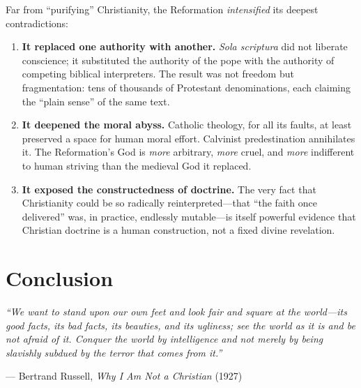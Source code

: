 \documentclass[11pt,twoside]{article}
\begin{document}
\begin{scheda}

Far from ``purifying'' Christianity, the Reformation \emph{intensified} its
deepest contradictions:

\begin{enumerate}
  \item \textbf{It replaced one authority with another.}
    \textit{Sola scriptura} did not liberate conscience; it substituted the
    authority of the pope with the authority of
    competing biblical interpreters.  The result was not freedom but
    fragmentation: tens of thousands of Protestant
    denominations, each claiming the
    ``plain sense'' of the same text.

  \item \textbf{It deepened the moral abyss.}
    Catholic theology, for all its faults, at least preserved a space for
    human moral effort.  Calvinist predestination annihilates it.  The
    Reformation's God is \emph{more} arbitrary, \emph{more} cruel, and
    \emph{more} indifferent to human striving than the medieval God it
    replaced.

  \item \textbf{It exposed the constructedness of doctrine.}
    The very fact that Christianity could be so radically reinterpreted---that
    ``the faith once delivered'' was, in practice, endlessly mutable---is
    itself powerful evidence that Christian doctrine is a human
    construction, not a
    fixed divine revelation.
\end{enumerate}
\end{scheda}

\newpage

\section*{Conclusion}

\begin{citazione}
\textit{``We want to stand upon our own feet and look fair and square at the
world---its good facts, its bad facts, its beauties, and its ugliness; see
the world as it is and be not afraid of it.  Conquer the world by
intelligence and not merely by being slavishly subdued by the terror that
comes from it.''}

\medskip
\hfill--- Bertrand Russell, \textit{Why I Am Not a Christian} (1927)
\end{citazione}
\end{document}

